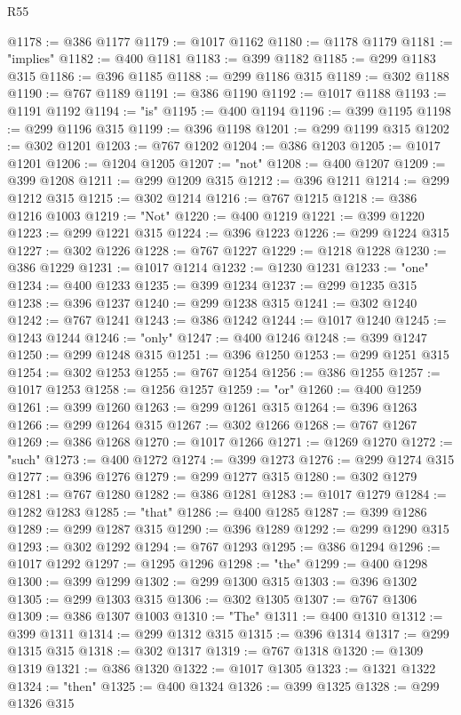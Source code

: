 \begin{lexlean}{R55}
\begin{coremodule}
@1178 := @386 @1177
@1179 := @1017 @1162
@1180 := @1178 @1179
@1181 := "implies"
@1182 := @400 @1181
@1183 := @399 @1182
@1185 := @299 @1183 @315
@1186 := @396 @1185
@1188 := @299 @1186 @315
@1189 := @302 @1188
@1190 := @767 @1189
@1191 := @386 @1190
@1192 := @1017 @1188
@1193 := @1191 @1192
@1194 := "is"
@1195 := @400 @1194
@1196 := @399 @1195
@1198 := @299 @1196 @315
@1199 := @396 @1198
@1201 := @299 @1199 @315
@1202 := @302 @1201
@1203 := @767 @1202
@1204 := @386 @1203
@1205 := @1017 @1201
@1206 := @1204 @1205
@1207 := "not"
@1208 := @400 @1207
@1209 := @399 @1208
@1211 := @299 @1209 @315
@1212 := @396 @1211
@1214 := @299 @1212 @315
@1215 := @302 @1214
@1216 := @767 @1215
@1218 := @386 @1216 @1003
@1219 := "Not"
@1220 := @400 @1219
@1221 := @399 @1220
@1223 := @299 @1221 @315
@1224 := @396 @1223
@1226 := @299 @1224 @315
@1227 := @302 @1226
@1228 := @767 @1227
@1229 := @1218 @1228
@1230 := @386 @1229
@1231 := @1017 @1214
@1232 := @1230 @1231
@1233 := "one"
@1234 := @400 @1233
@1235 := @399 @1234
@1237 := @299 @1235 @315
@1238 := @396 @1237
@1240 := @299 @1238 @315
@1241 := @302 @1240
@1242 := @767 @1241
@1243 := @386 @1242
@1244 := @1017 @1240
@1245 := @1243 @1244
@1246 := "only"
@1247 := @400 @1246
@1248 := @399 @1247
@1250 := @299 @1248 @315
@1251 := @396 @1250
@1253 := @299 @1251 @315
@1254 := @302 @1253
@1255 := @767 @1254
@1256 := @386 @1255
@1257 := @1017 @1253
@1258 := @1256 @1257
@1259 := "or"
@1260 := @400 @1259
@1261 := @399 @1260
@1263 := @299 @1261 @315
@1264 := @396 @1263
@1266 := @299 @1264 @315
@1267 := @302 @1266
@1268 := @767 @1267
@1269 := @386 @1268
@1270 := @1017 @1266
@1271 := @1269 @1270
@1272 := "such"
@1273 := @400 @1272
@1274 := @399 @1273
@1276 := @299 @1274 @315
@1277 := @396 @1276
@1279 := @299 @1277 @315
@1280 := @302 @1279
@1281 := @767 @1280
@1282 := @386 @1281
@1283 := @1017 @1279
@1284 := @1282 @1283
@1285 := "that"
@1286 := @400 @1285
@1287 := @399 @1286
@1289 := @299 @1287 @315
@1290 := @396 @1289
@1292 := @299 @1290 @315
@1293 := @302 @1292
@1294 := @767 @1293
@1295 := @386 @1294
@1296 := @1017 @1292
@1297 := @1295 @1296
@1298 := "the"
@1299 := @400 @1298
@1300 := @399 @1299
@1302 := @299 @1300 @315
@1303 := @396 @1302
@1305 := @299 @1303 @315
@1306 := @302 @1305
@1307 := @767 @1306
@1309 := @386 @1307 @1003
@1310 := "The"
@1311 := @400 @1310
@1312 := @399 @1311
@1314 := @299 @1312 @315
@1315 := @396 @1314
@1317 := @299 @1315 @315
@1318 := @302 @1317
@1319 := @767 @1318
@1320 := @1309 @1319
@1321 := @386 @1320
@1322 := @1017 @1305
@1323 := @1321 @1322
@1324 := "then"
@1325 := @400 @1324
@1326 := @399 @1325
@1328 := @299 @1326 @315

\end{coremodule}
\end{lexlean}
